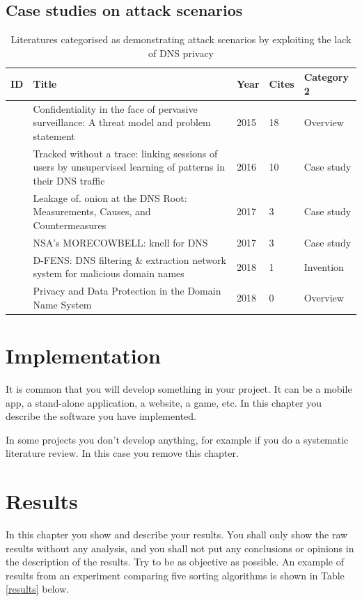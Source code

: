 \documentclass[a4paper,12pt]{article}
\begin{document}
\subsection{Case studies on attack scenarios}
\begin{table}[h!]
    \begin{tabular}{ | l | p{9cm} | l | l | l | }
        \hline
            ID & Title & Year & Cites & Category 2 \\ \hline
            \cite{barnes2015confidentiality} & Confidentiality in the face of pervasive surveillance: A threat model and problem statement & 2015 & 18 & Overview \\ \hline
            \cite{kirchler2016tracked} & Tracked without a trace: linking sessions of users by unsupervised learning of patterns in their DNS traffic & 2016 & 10 & Case study \\ \hline
            \cite{mohaisen2017leakage} & Leakage of. onion at the DNS Root: Measurements, Causes, and Countermeasures & 2017 & 3 & Case study \\ \hline
            \cite{grothoff2017nsa} & NSA's MORECOWBELL: knell for DNS & 2017 & 3 & Case study \\ \hline
            \cite{spaulding2018d} & D-FENS: DNS filtering \& extraction network system for malicious domain names & 2018 & 1 & Invention \\ \hline
            \cite{kelpen2018privacy} & Privacy and Data Protection in the Domain Name System & 2018 & 0 & Overview \\ \hline
        \end{tabular}
        \caption{Literatures categorised as demonstrating attack scenarios by exploiting the lack of DNS privacy}
\label{attacks}
\end{table}
\FloatBarrier
\section{Implementation}
It is common that you will develop something in your project. It can be a mobile app, a stand-alone application, a website, a game, etc. In this chapter you describe the software you have implemented. 

In some projects you don't develop anything, for example if you do a systematic literature review. In this case you remove this chapter.

\newpage

\section{Results}
In this chapter you show and describe your results. You shall only show the raw results without any analysis, and you shall not put any conclusions or opinions in the description of the results. Try to be as objective as possible. An example of results from an experiment comparing five sorting algorithms is shown in Table \ref{results} below.\\
\end{document}
